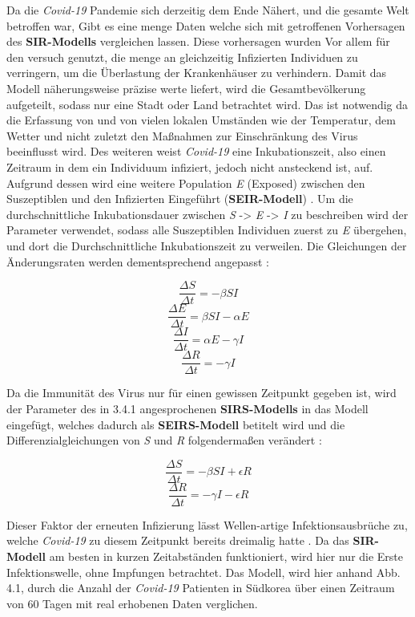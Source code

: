 \documentclass[12pt]{scrartcl} %
\begin{document}
Da die \textsl{Covid-19} Pandemie sich derzeitig dem Ende Nähert, und die gesamte Welt betroffen war, Gibt es eine menge Daten welche sich mit getroffenen Vorhersagen des \textbf{SIR-Modells} vergleichen lassen. Diese vorhersagen wurden Vor allem für den versuch genutzt, die menge an gleichzeitig Infizierten Individuen zu verringern, um die Überlastung der Krankenhäuser zu verhindern. Damit das Modell näherungsweise präzise werte liefert, wird die Gesamtbevölkerung aufgeteilt, sodass nur eine Stadt oder Land betrachtet wird. Das ist notwendig da die Erfassung von \textbeta\space und \textgamma\space von vielen lokalen Umständen wie der Temperatur, dem Wetter und nicht zuletzt den Maßnahmen zur Einschränkung des Virus beeinflusst wird. 
Des weiteren weist \textsl{Covid-19} eine Inkubationszeit, also einen Zeitraum in dem ein Individuum infiziert, jedoch nicht ansteckend ist, auf. Aufgrund dessen wird eine weitere Population \textit{E} (Exposed) zwischen den Suszeptiblen und den Infizierten Eingeführt (\textbf{SEIR-Modell}) \cite{11, 3}. Um die durchschnittliche Inkubationsdauer zwischen \textit{S} -> \textit{E} -> \textit{I} zu beschreiben wird der Parameter \textalpha\space verwendet, sodass alle Suszeptiblen Individuen zuerst zu \textit{E} übergehen, und dort die Durchschnittliche Inkubationszeit zu verweilen. Die Gleichungen der Änderungsraten werden dementsprechend angepasst \cite{2, 3}:

$$ \frac{\Delta S}{\Delta t} = -\beta S I $$
$$ \frac{\Delta E}{\Delta t} = \beta S I - \alpha E$$
$$ \frac{\Delta I}{\Delta t} = \alpha E - \gamma I $$
$$ \frac{\Delta R}{\Delta t} = -\gamma I $$

Da die Immunität des Virus nur für einen gewissen Zeitpunkt gegeben ist, wird der Parameter \textepsilon\space des in 3.4.1 angesprochenen \textbf{SIRS-Modells} in das Modell eingefügt, welches dadurch als \textbf{SEIRS-Modell} betitelt wird und die Differenzialgleichungen von \textsl{S} und \textit{R} folgendermaßen verändert \cite{8}:

$$ \frac{\Delta S}{\Delta t} = -\beta S I + \epsilon R$$
$$ \frac{\Delta R}{\Delta t} = -\gamma I - \epsilon R$$

Dieser Faktor der erneuten Infizierung lässt Wellen-artige Infektionsausbrüche zu, welche \textsl{Covid-19} zu diesem Zeitpunkt bereits dreimalig hatte \cite{3}. Da das \textbf{SIR-Modell} am besten in kurzen Zeitabständen funktioniert, wird hier nur die Erste Infektionswelle, ohne Impfungen betrachtet. Das Modell, wird hier anhand Abb. 4.1, durch die Anzahl der \textsl{Covid-19} Patienten in Südkorea über einen Zeitraum von 60 Tagen mit real erhobenen Daten verglichen.
\end{document}
